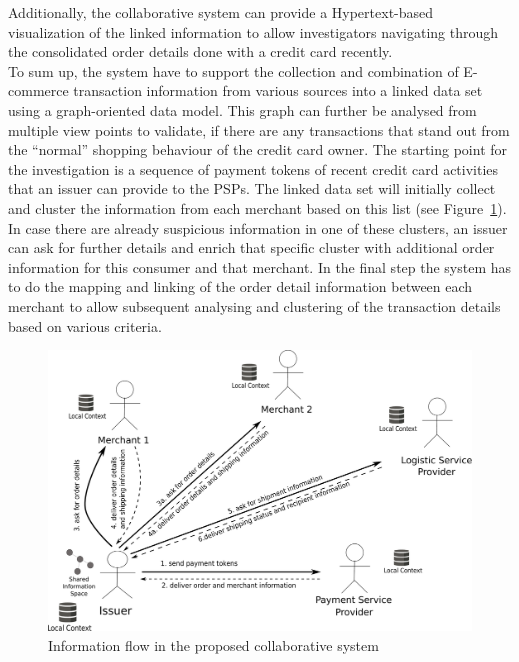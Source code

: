 Additionally, the collaborative system can provide a Hypertext-based visualization of the linked information to allow investigators navigating through the consolidated order details done with a credit card recently. \\

To sum up, the system have to support the collection and combination of \gls{E-commerce} transaction information from various sources into a linked data set using a graph-oriented data model. This graph can further be analysed from multiple view points to validate, if there are any transactions that stand out from the ``normal'' shopping behaviour of the credit card owner. The starting point for the investigation is a sequence of payment tokens of recent credit card activities that an issuer can provide to the \gls{PSP}s. The linked data set will initially collect and cluster the information from each merchant based on this list (see Figure~\ref{fig:system_workflow}). In case there are already suspicious information in one of these clusters, an issuer can ask for further details and enrich that specific cluster with additional order information for this consumer and that merchant. In the final step the system has to do the mapping and linking of the order detail information between each merchant to allow subsequent analysing and clustering of the transaction details based on various criteria.

\begin{figure}[H]
  \centering
  \includegraphics[width=0.7\columnwidth]{images/system_P2P_decentralized.pdf}
  \caption{Information flow in the proposed collaborative system}
\label{fig:system_workflow}
\end{figure}

